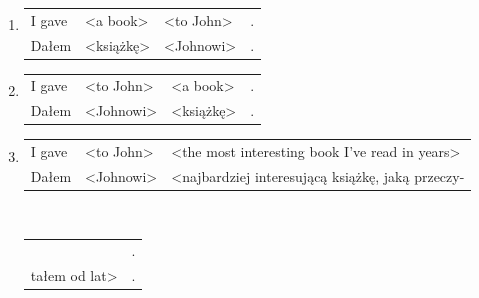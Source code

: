 \documentclass[licencjacka]{pracamgr_Kogni}
\begin{document}
    \begin{exe}
        \ex
        \begin{enumerate}
            \item
            \begin{tabular}[t]{l l l l}
                I gave                & <a book>  & <to John> & . \\
                Dałem\footnotemark[7] & <książkę> & <Johnowi> & . \\
            \end{tabular}
            \label{ex:7a}
            \item
            \begin{tabular}[t]{l l l l}
                I gave & <to John> & <a book>  & . \\
                Dałem  & <Johnowi> & <książkę> & . \\
            \end{tabular}
            \label{ex:7b}
            \item
            \begin{tabular}[t]{l l l}
                I gave & <to John> & <the most interesting book I've read in years>   \\
                Dałem  & <Johnowi> & <najbardziej interesującą książkę, jaką przeczy- \\
            \end{tabular}
            \\
            \begin{tabular}[t]{l l}
                & . \\
                tałem od lat> & . \\
            \end{tabular}
            \label{ex:7c}
        \end{enumerate}
        \label{ex:7}
    \end{exe}
    \setcounter{footnote}{7}
\end{document}
